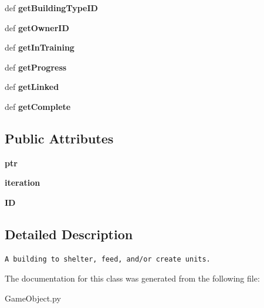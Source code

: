 \begin{CompactItemize}
\item 
\hypertarget{classGameObject_1_1Building_54a606aff2e25347bc86dd6be922243d}{
def \textbf{getBuildingTypeID}}
\label{classGameObject_1_1Building_54a606aff2e25347bc86dd6be922243d}

\item 
\hypertarget{classGameObject_1_1Building_38b3022fc69b136f6919a303e6ebe38a}{
def \textbf{getOwnerID}}
\label{classGameObject_1_1Building_38b3022fc69b136f6919a303e6ebe38a}

\item 
\hypertarget{classGameObject_1_1Building_d16ef9f3fce2ae5ad621ba38b861e8eb}{
def \textbf{getInTraining}}
\label{classGameObject_1_1Building_d16ef9f3fce2ae5ad621ba38b861e8eb}

\item 
\hypertarget{classGameObject_1_1Building_17c60f336f9ec57370a9aa66a2ce513f}{
def \textbf{getProgress}}
\label{classGameObject_1_1Building_17c60f336f9ec57370a9aa66a2ce513f}

\item 
\hypertarget{classGameObject_1_1Building_768d8e4b043a44a7a8716053a032d9c4}{
def \textbf{getLinked}}
\label{classGameObject_1_1Building_768d8e4b043a44a7a8716053a032d9c4}

\item 
\hypertarget{classGameObject_1_1Building_f65e3f7d76af3b4f59049ea28c55c5c3}{
def \textbf{getComplete}}
\label{classGameObject_1_1Building_f65e3f7d76af3b4f59049ea28c55c5c3}

\end{CompactItemize}
\subsection*{Public Attributes}
\begin{CompactItemize}
\item 
\hypertarget{classGameObject_1_1Building_75182603210be4e2339843163b9c50a1}{
\textbf{ptr}}
\label{classGameObject_1_1Building_75182603210be4e2339843163b9c50a1}

\item 
\hypertarget{classGameObject_1_1Building_72b0c8b116aacbcc5c86bbff21ffb3c0}{
\textbf{iteration}}
\label{classGameObject_1_1Building_72b0c8b116aacbcc5c86bbff21ffb3c0}

\item 
\hypertarget{classGameObject_1_1Building_408aaa29bf5784b179852119ef2cccef}{
\textbf{ID}}
\label{classGameObject_1_1Building_408aaa29bf5784b179852119ef2cccef}

\end{CompactItemize}


\subsection{Detailed Description}


\footnotesize\begin{verbatim}A building to shelter, feed, and/or create units.
\end{verbatim}
\normalsize
 

The documentation for this class was generated from the following file:\begin{CompactItemize}
\item 
GameObject.py\end{CompactItemize}
